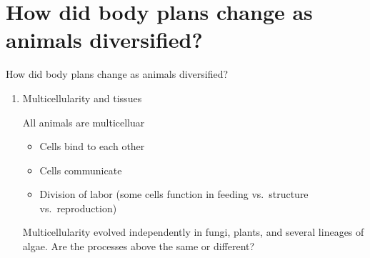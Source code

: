 \section[Evolution of animal body plan]{How did body plans change as animals
    diversified?}

\begin{frame}
    \begin{adjustwidth}{-2em}{-1.5em}
        How did body plans change as animals diversified?

        \begin{enumerate}

            \item Multicellularity and tissues

                \vspace{2mm}
                All animals are multicelluar

                \begin{itemize}

                    \item Cells bind to each other
                    \item Cells communicate
                    \item Division of labor (some cells function in feeding
                        vs.\ structure vs.\ reproduction)

                \end{itemize}

                Multicellularity evolved independently in fungi, plants, and
                several lineages of algae. Are the processes above the same or
                different?


        \end{enumerate}
    \end{adjustwidth}
\end{frame}

